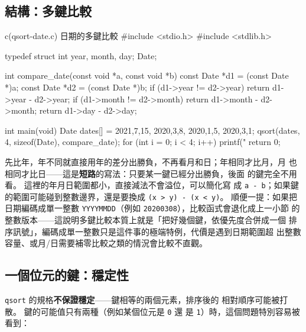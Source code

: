 \subsection{結構：多鍵比較}

\begin{example}{c}{(qsort-date.c) 日期的多鍵比較}
#include <stdio.h>
#include <stdlib.h>

typedef struct { int year, month, day; } Date;

int compare_date(const void *a, const void *b) {
    const Date *d1 = (const Date *)a;
    const Date *d2 = (const Date *)b;
    if (d1->year != d2->year) return d1->year - d2->year;
    if (d1->month != d2->month) return d1->month - d2->month;
    return d1->day - d2->day;
}

int main(void) {
    Date dates[] = {{2021,7,15}, {2020,3,8}, {2020,1,5}, {2020,3,1}};
    qsort(dates, 4, sizeof(Date), compare_date);
    for (int i = 0; i < 4; i++)
        printf("%
    return 0;
}
\end{example}


先比年，年不同就直接用年的差分出勝負，不再看月和日；年相同才比月，月
也相同才比日——這是\textbf{短路}的寫法：只要某一鍵已經分出勝負，後面
的鍵完全不用看。 這裡的年月日範圍都小，直接減法不會溢位，可以簡化寫
成 \texttt{a - b}；如果鍵的範圍可能碰到整數邊界，還是要換成
\texttt{(x > y) - (x < y)}。 順便一提：如果把日期編碼成單一整數
\texttt{YYYYMMDD}（例如 \texttt{20200308}），比較函式會退化成上一小節
的整數版本——這說明多鍵比較本質上就是「把好幾個鍵，依優先度合併成一個
排序訊號」，編碼成單一整數只是這件事的極端特例，代價是遇到日期範圍超
出整數容量、或月/日需要補零比較之類的情況會比較不直觀。

\subsection{一個位元的鍵：穩定性}

\texttt{qsort} 的規格\textbf{不保證穩定}——鍵相等的兩個元素，排序後的
相對順序可能被打散。 鍵的可能值只有兩種（例如某個位元是 \texttt{0} 還
是 \texttt{1}）時，這個問題特別容易被看到：

